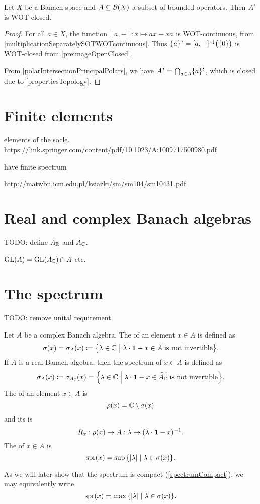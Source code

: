 \begin{proposition}
Let $X$ be a Banach space and $A\subseteq \operatorname{\mathcal{B}}(X)$ a subset of bounded operators. Then $A^{\comm}$ is WOT-closed.
\end{proposition}
\begin{proof}
For all $a\in X$, the function $[a,-]: x \mapsto ax-xa$ is WOT-continuous, from \ref{multiplicationSeparatelySOTWOTcontinuous}. Thus $\{a\}^{\comm} = [a,-]^{\preimf}\big(\{0\}\big)$ is WOT-closed from \ref{preimageOpenClosed}.

From \ref{polarIntersectionPrincipalPolars}, we have $A^{\comm} = \bigcap_{a\in A}\{a\}^{\comm}$, which is closed due to \ref{propertiesTopology}.
\end{proof}

\section{Finite elements}
elements of the socle. \url{https://link.springer.com/content/pdf/10.1023/A:1009717500980.pdf}

have finite spectrum 

\url{http://matwbn.icm.edu.pl/ksiazki/sm/sm104/sm10431.pdf}

\section{Real and complex Banach algebras}
TODO: define $A_{\mathbb{R}}$ and $A_{\mathbb{C}}$.

\begin{proposition} \label{preservationAlgebraicPropertiesComplexificationRealification}
$\operatorname{GL}(A) = \operatorname{GL}(A_{\mathbb{C}})\cap A$ etc.
\end{proposition}

\section{The spectrum}
TODO: remove unital requirement.
\begin{definition}
Let $A$ be a complex Banach algebra. The  of an element $x\in A$ is defined as
\[ \spec(x) = \spec_A(x) \defeq \setbuilder{\lambda\in\C}{\lambda\cdot \vec{1} - x \in \tilde{A} \;\text{is not invertible}}. \]
If $A$ is a real Banach algebra, then the spectrum of $x\in A$ is defined as
\[ \spec_A(x) \defeq \spec_{A_\C}(x) = \setbuilder{\lambda\in\C}{\lambda\cdot \vec{1} - x \in \widetilde{A_\C} \;\text{is not invertible}}.  \]
The  of an element $x\in A$ is
\[ \rho(x) = \mathbb{C}\setminus\sigma(x) \]
and its  is
\[ R_x: \rho(x) \to A : \lambda\mapsto (\lambda\cdot\boldsymbol{\mathrm{1}}  - x)^{-1}. \]
The  of $x\in A$ is
\[ \spr(x) = \sup\setbuilder{|\lambda|}{\lambda\in\spec(x)}. \]
\end{definition}
As we will later show that the spectrum is compact (\ref{spectrumCompact}), we may equivalently write
\[ \spr(x) = \max\setbuilder{|\lambda|}{\lambda\in\spec(x)}. \]

